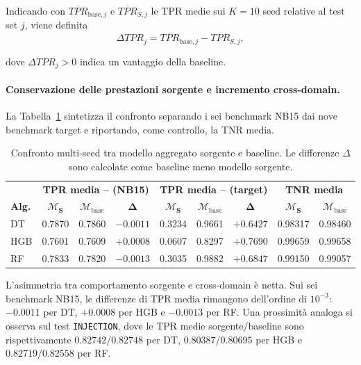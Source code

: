 Indicando con $\overline{TPR}_{\mathrm{base},j}$ e $\overline{TPR}_{S,j}$ le TPR medie sui $K=10$ seed relative al test set $j$, viene definita
\begin{equation}
    \Delta TPR_j =
    \overline{TPR}_{\mathrm{base},j}
    -
    \overline{TPR}_{S,j},
    \label{eq:delta_tpr_source_baseline}
\end{equation}

dove $\Delta TPR_j>0$ indica un vantaggio della baseline.

\paragraph{Conservazione delle prestazioni sorgente e incremento cross-domain.}
La Tabella~\ref{tab:source_vs_base_summary_tpr} sintetizza il confronto separando i sei benchmark NB15 dai nove benchmark target e riportando, come controllo, la TNR media.

\begin{table}[H]
    \centering
    \small
    \caption{Confronto multi-seed tra modello aggregato sorgente e baseline. Le differenze $\Delta$ sono calcolate come baseline meno modello sorgente.}
    \label{tab:source_vs_base_summary_tpr}
    \begin{tabular}{lccc|ccc|cc}
        \toprule
        & \multicolumn{3}{c|}{\textbf{TPR media -- (NB15)}} & \multicolumn{3}{c|}{\textbf{TPR media -- (target)}} & \multicolumn{2}{c}{\textbf{TNR media}} \\
        \textbf{Alg.} & $\boldsymbol{\mathcal{M}_{S}}$ & $\boldsymbol{\mathcal{M}_{\mathrm{base}}}$ & $\boldsymbol{\Delta}$ & $\boldsymbol{\mathcal{M}_{S}}$ & $\boldsymbol{\mathcal{M}_{\mathrm{base}}}$ & $\boldsymbol{\Delta}$ & $\boldsymbol{\mathcal{M}_{S}}$ & $\boldsymbol{\mathcal{M}_{\mathrm{base}}}$ \\
        \midrule
        DT & 0.7870 & 0.7860 & $-0.0011$ & 0.3234 & 0.9661 & $+0.6427$ & 0.98317 & 0.98460 \\
        HGB & 0.7601 & 0.7609 & $+0.0008$ & 0.0607 & 0.8297 & $+0.7690$ & 0.99659 & 0.99658 \\
        RF & 0.7833 & 0.7820 & $-0.0013$ & 0.3035 & 0.9882 & $+0.6847$ & 0.99150 & 0.99057 \\
        \bottomrule
    \end{tabular}
\end{table}

L'asimmetria tra comportamento sorgente e cross-domain è netta. 
Sui sei benchmark NB15, le differenze di TPR media rimangono dell'ordine di $10^{-3}$: $-0.0011$ per DT, $+0.0008$ per HGB e $-0.0013$ per RF. 
Una prossimità analoga si osserva sul test \texttt{INJECTION}, dove le TPR medie sorgente/baseline sono rispettivamente $0.82742/0.82748$ per DT, $0.80387/0.80695$ per HGB e $0.82719/0.82558$ per RF.

